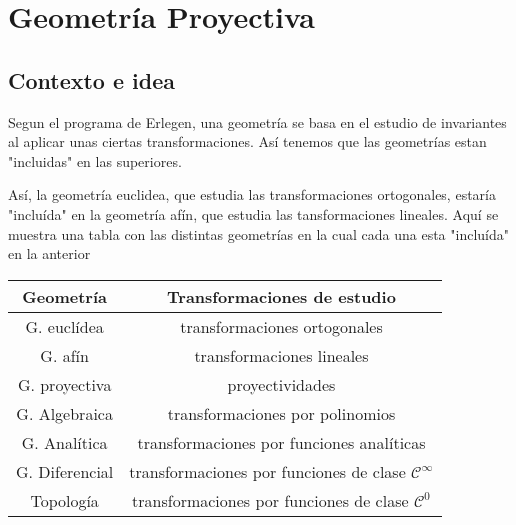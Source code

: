\section{Geometría Proyectiva}
\subsection{Contexto e idea}
Segun el programa de Erlegen, una geometría se basa en el estudio de invariantes
al aplicar unas ciertas transformaciones. Así tenemos que las geometrías estan
"incluidas" en las superiores.

Así, la geometría euclidea, que estudia las transformaciones ortogonales, estaría
"incluída" en la geometría afín, que estudia las tansformaciones lineales. Aquí
se muestra una tabla con las distintas geometrías en la cual cada una esta
"incluída" en la anterior
\begin{center}
	\begin{tabular}{|c|c|}
		\hline Geometría & Transformaciones de estudio \\
		\hline \hline
		G. euclídea  & transformaciones ortogonales \\ \hline
		G. afín & transformaciones lineales \\ \hline
		G. proyectiva & proyectividades \\ \hline
		G. Algebraica & transformaciones por polinomios \\ \hline
		G. Analítica & transformaciones por funciones analíticas \\ \hline
		G. Diferencial & transformaciones por funciones de clase
		$\mathcal{C}^\infty$ \\ \hline
		Topología & transformaciones por funciones de clase $\mathcal{C}^0$\\ \hline
	\end{tabular}
\end{center}

